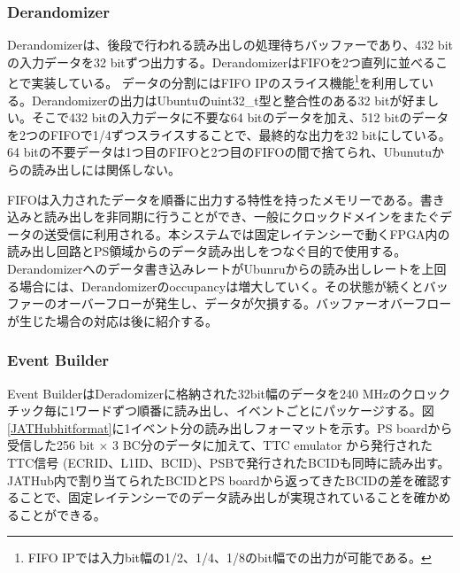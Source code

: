 \subsubsection{Derandomizer} \par
Derandomizerは、後段で行われる読み出しの処理待ちバッファーであり、432 bitの入力データを32 bitずつ出力する。DerandomizerはFIFOを2つ直列に並べることで実装している。
データの分割にはFIFO IPのスライス機能\footnote{FIFO IPでは入力bit幅の1/2、1/4、1/8のbit幅での出力が可能である。}を利用している。Derandomizerの出力はUbuntuのuint32\_t型と整合性のある32 bitが好ましい。そこで432 bitの入力データに不要な64 bitのデータを加え、512 bitのデータを2つのFIFOで1/4ずつスライスすることで、最終的な出力を32 bitにしている。64 bitの不要データは1つ目のFIFOと2つ目のFIFOの間で捨てられ、Ubunutuからの読み出しには関係しない。\par
FIFOは入力されたデータを順番に出力する特性を持ったメモリーである。書き込みと読み出しを非同期に行うことができ、一般にクロックドメインをまたぐデータの送受信に利用される。本システムでは固定レイテンシーで動くFPGA内の読み出し回路とPS領域からのデータ読み出しをつなぐ目的で使用する。Derandomizerへのデータ書き込みレートがUbunruからの読み出しレートを上回る場合には、Derandomizerのoccupancyは増大していく。その状態が続くとバッファーのオーバーフローが発生し、データが欠損する。バッファーオバーフローが生じた場合の対応は後に紹介する。
\baselineskip

\subsubsection{Event Builder} \par
Event BuilderはDeradomizerに格納された32bit幅のデータを240 MHzのクロックチック毎に1ワードずつ順番に読み出し、イベントごとにパッケージする。図\ref{JATHubhitformat}に1イベント分の読み出しフォーマットを示す。PS boardから受信した256 bit $\times$ 3 BC分のデータに加えて、TTC emulator から発行されたTTC信号 (ECRID、L1ID、BCID)、PSBで発行されたBCIDも同時に読み出す。JATHub内で割り当てられたBCIDとPS boardから返ってきたBCIDの差を確認することで、固定レイテンシーでのデータ読み出しが実現されていることを確かめることができる。
\baselineskip

